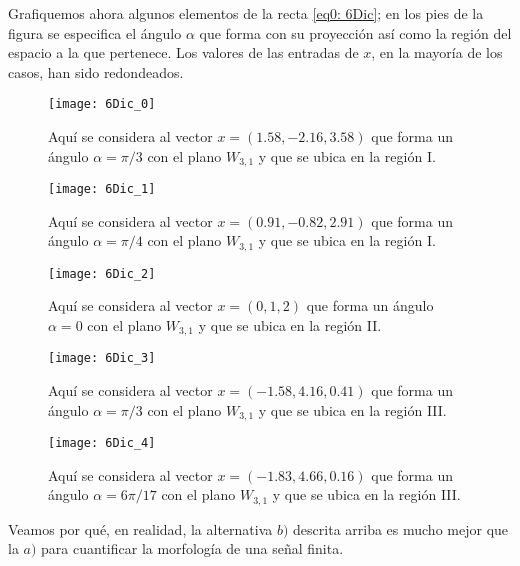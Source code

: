 \begin{ej}
\begin{itemize}
Grafiquemos ahora algunos elementos
de la recta \eqref{eq0: 6Dic}; en los pies
de la figura se especifica el ángulo
$\alpha$ que forma con su proyección así
como la región del espacio a la que pertenece.
Los valores de las entradas de $x$, en la
mayoría de los casos, han sido redondeados.
\end{itemize}
\begin{figure}[H]
\centering\captionsetup{format = hang}
	\begin{measuredfigure}
		\texttt{[image: 6Dic\_0]} 
		\caption{Aquí se considera al vector 
		$x=(1.58, -2.16,3.58)$ que forma un ángulo $\alpha=\pi/3$
		con el plano $W_{3,1}$ y que se ubica en la región I.
		}
 	\end{measuredfigure}
 \end{figure}


\begin{figure}[H]
\centering\captionsetup{format = hang}
	\begin{measuredfigure}
		\texttt{[image: 6Dic\_1]} 
		\caption{Aquí se considera al vector 
		$x=(0.91,-0.82,2.91)$ que forma un ángulo $\alpha=\pi/4$
		con el plano $W_{3,1}$ y que se ubica en la región I.}
 	\end{measuredfigure}
 \end{figure}
 
 
\begin{figure}[H]
\centering\captionsetup{format = hang}
	\begin{measuredfigure}
		\texttt{[image: 6Dic\_2]} 
		\caption{Aquí se considera al vector 
		$x=(0,1,2)$ que forma un ángulo $\alpha=0$
		con el plano $W_{3,1}$ y que se ubica en la región II.}
 	\end{measuredfigure}
 \end{figure}

\begin{figure}[H]
\centering\captionsetup{format = hang}
	\begin{measuredfigure}
		\texttt{[image: 6Dic\_3]} 
		\caption{Aquí se considera al vector
		$x=(-1.58,4.16,0.41)$ que forma un ángulo $\alpha=\pi/3$
		con el plano $W_{3,1}$ y que se ubica en la región III.}
 	\end{measuredfigure}
 \end{figure}
 
 
\begin{figure}[H]
\centering\captionsetup{format = hang}
	\begin{measuredfigure}
		\texttt{[image: 6Dic\_4]} 
		\caption{Aquí se considera al vector 
		$x=(-1.83,4.66,0.16)$ que forma un ángulo $\alpha=6\pi/17$
		con el plano $W_{3,1}$ y que se ubica en la región III.}
 	\end{measuredfigure}
 \end{figure}
 
 
\begin{nota} 
Veamos por qué, en realidad, la alternativa $b)$
descrita arriba es mucho mejor que la $a)$ para cuantificar 
la morfología de una señal finita.

 
 
 
\end{nota}
\final
\end{ej}